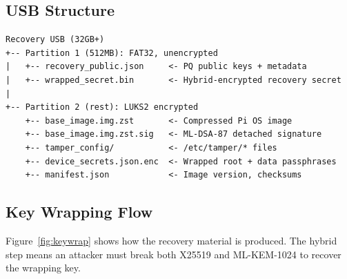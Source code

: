 \documentclass[11pt,letterpaper]{article}
\begin{document}
\subsection{USB Structure}

\begin{lstlisting}
Recovery USB (32GB+)
+-- Partition 1 (512MB): FAT32, unencrypted
|   +-- recovery_public.json     <- PQ public keys + metadata
|   +-- wrapped_secret.bin       <- Hybrid-encrypted recovery secret
|
+-- Partition 2 (rest): LUKS2 encrypted
    +-- base_image.img.zst       <- Compressed Pi OS image
    +-- base_image.img.zst.sig   <- ML-DSA-87 detached signature
    +-- tamper_config/           <- /etc/tamper/* files
    +-- device_secrets.json.enc  <- Wrapped root + data passphrases
    +-- manifest.json            <- Image version, checksums
\end{lstlisting}

\subsection{Key Wrapping Flow}

Figure~\ref{fig:keywrap} shows how the recovery material is produced. The hybrid step means an attacker must break both X25519 and ML-KEM-1024 to recover the wrapping key.
\end{document}
